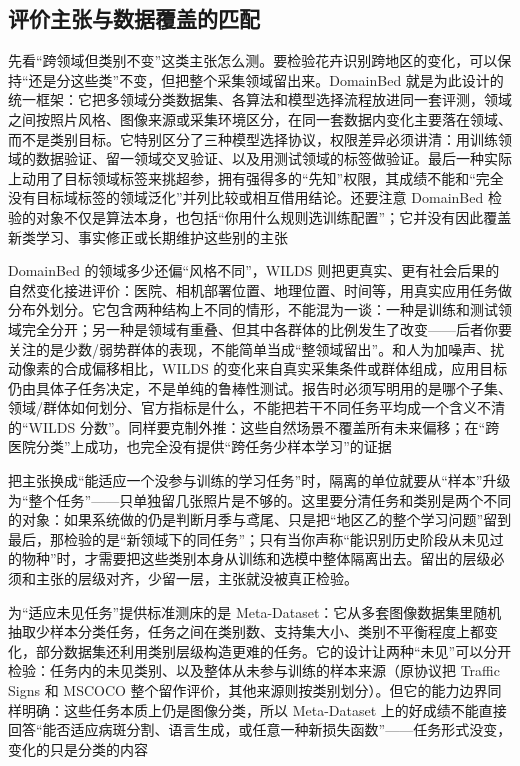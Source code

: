 \subsection{评价主张与数据覆盖的匹配}
\label{sec:ket-evaluation-coverage}

先看“跨领域但类别不变”这类主张怎么测。要检验花卉识别跨地区的变化，可以保持“还是分这些类”不变，但把整个采集领域留出来。DomainBed 就是为此设计的统一框架：它把多领域分类数据集、各算法和模型选择流程放进同一套评测，领域之间按照片风格、图像来源或采集环境区分，在同一套数据内变化主要落在领域、而不是类别目标。它特别区分了三种模型选择协议，权限差异必须讲清：用训练领域的数据验证、留一领域交叉验证、以及用测试领域的标签做验证。最后一种实际上动用了目标领域标签来挑超参，拥有强得多的“先知”权限，其成绩不能和“完全没有目标域标签的领域泛化”并列比较或相互借用结论。还要注意 DomainBed 检验的对象不仅是算法本身，也包括“你用什么规则选训练配置”；它并没有因此覆盖新类学习、事实修正或长期维护这些别的主张

DomainBed 的领域多少还偏“风格不同”，WILDS 则把更真实、更有社会后果的自然变化接进评价：医院、相机部署位置、地理位置、时间等，用真实应用任务做分布外划分。它包含两种结构上不同的情形，不能混为一谈：一种是训练和测试领域完全分开；另一种是领域有重叠、但其中各群体的比例发生了改变——后者你要关注的是少数/弱势群体的表现，不能简单当成“整领域留出”。和人为加噪声、扰动像素的合成偏移相比，WILDS 的变化来自真实采集条件或群体组成，应用目标仍由具体子任务决定，不是单纯的鲁棒性测试。报告时必须写明用的是哪个子集、领域/群体如何划分、官方指标是什么，不能把若干不同任务平均成一个含义不清的“WILDS 分数”。同样要克制外推：这些自然场景不覆盖所有未来偏移；在“跨医院分类”上成功，也完全没有提供“跨任务少样本学习”的证据

把主张换成“能适应一个没参与训练的学习任务”时，隔离的单位就要从“样本”升级为“整个任务”——只单独留几张照片是不够的。这里要分清任务和类别是两个不同的对象：如果系统做的仍是判断月季与鸢尾、只是把“地区乙的整个学习问题”留到最后，那检验的是“新领域下的同任务”；只有当你声称“能识别历史阶段从未见过的物种”时，才需要把这些类别本身从训练和选模中整体隔离出去。留出的层级必须和主张的层级对齐，少留一层，主张就没被真正检验。

为“适应未见任务”提供标准测床的是 Meta-Dataset：它从多套图像数据集里随机抽取少样本分类任务，任务之间在类别数、支持集大小、类别不平衡程度上都变化，部分数据集还利用类别层级构造更难的任务。它的设计让两种“未见”可以分开检验：任务内的未见类别、以及整体从未参与训练的样本来源（原协议把 Traffic Signs 和 MSCOCO 整个留作评价，其他来源则按类别划分）。但它的能力边界同样明确：这些任务本质上仍是图像分类，所以 Meta-Dataset 上的好成绩不能直接回答“能否适应病斑分割、语言生成，或任意一种新损失函数”——任务形式没变，变化的只是分类的内容


